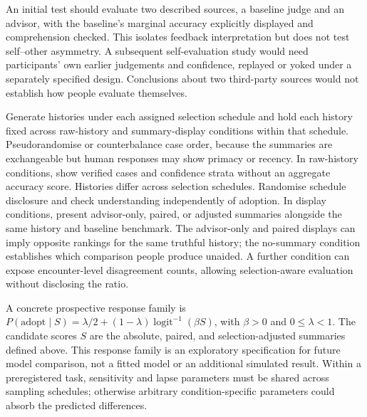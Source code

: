 \documentclass[
  british,
  11pt,
]{article}
\begin{document}
An initial test should evaluate two described sources, a baseline judge
and an advisor, with the baseline's marginal accuracy explicitly
displayed and comprehension checked. This isolates feedback
interpretation but does not test self--other asymmetry. A subsequent
self-evaluation study would need participants' own earlier judgements
and confidence, replayed or yoked under a separately specified design.
Conclusions about two third-party sources would not establish how people
evaluate themselves.

Generate histories under each assigned selection schedule and hold each
history fixed across raw-history and summary-display conditions within
that schedule. Pseudorandomise or counterbalance case order, because the
summaries are exchangeable but human responses may show primacy or
recency. In raw-history conditions, show verified cases and confidence
strata without an aggregate accuracy score. Histories differ across
selection schedules. Randomise schedule disclosure and check
understanding independently of adoption. In display conditions, present
advisor-only, paired, or adjusted summaries alongside the same history
and baseline benchmark. The advisor-only and paired displays can imply
opposite rankings for the same truthful history; the no-summary
condition establishes which comparison people produce unaided. A further
condition can expose encounter-level disagreement counts, allowing
selection-aware evaluation without disclosing the ratio.

A concrete prospective response family is
\(P(\mathrm{adopt}\mid S)=\lambda/2+(1-\lambda)\operatorname{logit}^{-1}(\beta S)\),
with \(\beta>0\) and \(0\leq\lambda<1\). The candidate scores \(S\) are
the absolute, paired, and selection-adjusted summaries defined above.
This response family is an exploratory specification for future model
comparison, not a fitted model or an additional simulated result. Within
a preregistered task, sensitivity and lapse parameters must be shared
across sampling schedules; otherwise arbitrary condition-specific
parameters could absorb the predicted differences.
\end{document}
